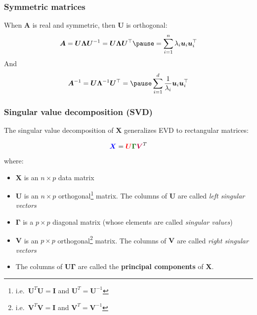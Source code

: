 \documentclass[smaller]{beamer}
\newcommand{\?}{\stackrel{?}{=}}
\newcommand{\fr}{\frac}
\newcommand{\ol}{\overline}
\newcommand{\rd}{\color{red}}
\newcommand{\bl}{\color{blue}}
\newcommand{\pl}{\color{purple}}
\newcommand{\gr}{\color{green!40!black}}
\newcommand{\la}{\lambda}
\newcommand{\tr}{^{\top}}
\begin{document}
\begin{frame}
  \frametitle{Symmetric matrices}
  \pause
  When $\bm A$ is real and symmetric, then $\bm U$ is orthogonal:\pause
  \begin{equation}
      \bm A = \bm U\bm\Lambda\bm U^{-1} = \bm U\bm\Lambda\bm U\tr
      \pause = \sum_{i=1}^n\la_i\bm u_i\bm u_i\tr
  \end{equation}
\pause
And
\begin{equation}
  \bm A^{-1} = \bm U\bm\Lambda^{-1}\bm U\tr = \pause
  \sum_{i=1}^d\fr{1}{\la_i} \bm u_i\bm u_i\tr
\end{equation}
\end{frame}
\begin{frame}
  \frametitle{Singular value decomposition (SVD)}
  The singular value decomposition of $\bm X$ generalizes EVD to
  rectangular matrices:

  \begin{equation}
    {\bl \bm X} = \bm {{\rd U}{\gr \Gamma} {\pl V}}^T 
  \end{equation}

  \pause

  where:
  \begin{itemize}[<+->]
  \item   $\bm X$ is an $n\times p$ data matrix
  \item $\bm U$ is an $n\times p$ orthogonal\footnote{i.e.\ $\bm U^T\bm U = \bm I$ and $\bm U^T = \bm U^{-1}$} matrix. The columns of $\bm U$ are called \textit{\rd left singular vectors}
  \item  $\bm \Gamma$ is a $p\times p$ diagonal matrix (whose elements are called \textit{\gr singular values})
  \item  $\bm V$ is an $p\times p$ orthogonal\footnote{i.e.\ $\bm V^T\bm V= \bm I$  and  $\bm V^T = \bm V^{-1}$} matrix. The columns of $\bm V$ are called \textit{\pl right singular vectors}
  \item The columns of $\bm{U\Gamma}$ are called the \textbf{principal components} of $\bm X$.
\end{itemize}

\end{frame}
\end{document}
